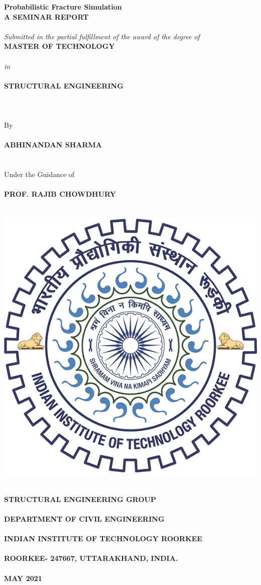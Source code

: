 \documentclass[12pt]{article}
\begin{document}
{\setmainfont{Times New Roman}
\begin{center}


    \vspace*{\fill}
    \textbf{\huge Probabilistic Fracture Simulation}
   \textbf{\\[.75in]\Large A SEMINAR REPORT\\~\\}
    \textit{\large Submitted in the partial fulfillment of the award of the degree of}\\[.55in]
    \textbf{\Large MASTER OF TECHNOLOGY}\\~\\\textit{\Large in}\\~\\ \textbf{\Large STRUCTURAL ENGINEERING}
    \\~\\~\\~\\{\Large By}\\~\\  \textbf{\Large ABHINANDAN SHARMA}\\~\\~\\
    Under the Guidance of
    \textbf{\\~\\\Large PROF. RAJIB CHOWDHURY}\\~\\~\\
    \includegraphics[width=.3\textwidth]{iitr.png}\\~\\~\\
    {\bf\large STRUCTURAL ENGINEERING GROUP\\~\\
DEPARTMENT OF CIVIL ENGINEERING\\~\\
INDIAN INSTITUTE OF TECHNOLOGY ROORKEE\\~\\
ROORKEE- 247667, UTTARAKHAND, INDIA.\\~\\
MAY 2021}
    \vspace*{\fill}
\end{center}
\pagebreak  

}
\end{document}
